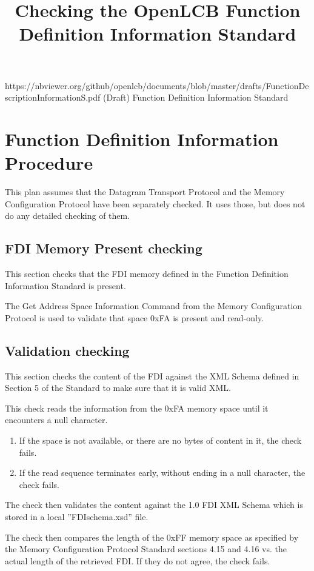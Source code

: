 

\title{Checking the OpenLCB Function Definition Information Standard}


\maketitle


\introductionCaveats
    {https://nbviewer.org/github/openlcb/documents/blob/master/drafts/FunctionDescriptionInformationS.pdf}
    {(Draft) Function Definition Information Standard}

\section{Function Definition Information Procedure}


This plan assumes that the Datagram Transport Protocol and the Memory Configuration Protocol 
have been separately checked. It uses those, but does not do any detailed checking of them.

\subsection{FDI Memory Present checking}

This section checks that the FDI memory defined in the Function 
Definition Information Standard is present.

The Get Address Space Information Command from the Memory Configuration Protocol
is used to validate that space 0xFA is present and read-only.

\subsection{Validation checking}

This section checks the content of the FDI against the XML Schema 
defined in Section 5 of the Standard to make sure that it is valid XML. 

This check reads the information from the 0xFA memory space
until it encounters a null character.
\begin{enumerate}
\item If the space is not available, or there are no bytes of content in it, the check fails.
\item If the read sequence terminates early, without ending in a null character, the check fails.
\end{enumerate}
 
The check then validates the content against the 1.0 FDI XML Schema
which is stored in a local ”FDIschema.xsd” file.

The check then compares the length of the 0xFF memory space 
as specified by the Memory Configuration Protocol Standard sections 4.15 and 4.16
vs. the actual length of the retrieved FDI.
If they do not agree, the check fails.

  
